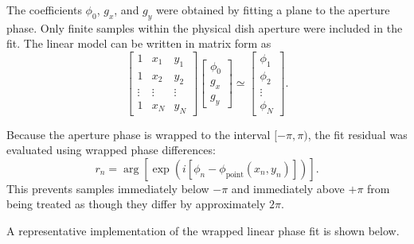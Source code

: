 \documentclass[12pt]{extarticle}
\begin{document}
The coefficients $\phi_0$, $g_x$, and $g_y$ were obtained by fitting a plane to the aperture phase. Only finite samples within the physical dish aperture were included in the fit. The linear model can be written in matrix form as
\begin{equation}
\begin{bmatrix}
1 & x_1 & y_1 \\
1 & x_2 & y_2 \\
\vdots & \vdots & \vdots \\
1 & x_N & y_N
\end{bmatrix}
\begin{bmatrix}
\phi_0 \\
g_x \\
g_y
\end{bmatrix}
\simeq
\begin{bmatrix}
\phi_1 \\
\phi_2 \\
\vdots \\
\phi_N
\end{bmatrix}.
\end{equation}

Because the aperture phase is wrapped to the interval $[-\pi,\pi)$, the fit residual was evaluated using wrapped phase differences:
\begin{equation}
r_n
=
\arg\left[
\exp\left(
i\left[
\phi_n-\phi_{\mathrm{point}}(x_n,y_n)
\right]
\right)
\right].
\end{equation}
This prevents samples immediately below $-\pi$ and immediately above $+\pi$ from being treated as though they differ by approximately $2\pi$.

A representative implementation of the wrapped linear phase fit is shown below.
\end{document}
